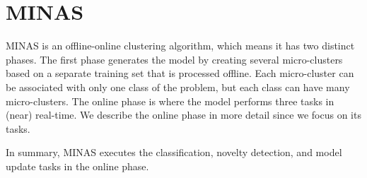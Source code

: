 \section{MINAS}
\label{sec:minas}




MINAS is an offline-online clustering algorithm, which means it has two distinct phases.
The first phase generates the model by creating several micro-clusters based
on a separate training set that is processed offline.
Each micro-cluster can be associated with only one class of the problem,
but each class can have many micro-clusters.
The online phase is where the model performs three tasks in (near) real-time.
We describe the online phase in more detail since we focus on its tasks. 

In summary, MINAS executes the classification, novelty detection,
and model update tasks in the online phase.

